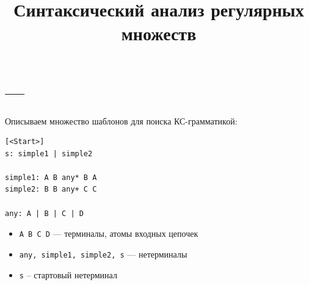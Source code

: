\documentclass[a5paper]{article}
\title{Синтаксический анализ регулярных множеств}
\begin{document}




\section*{---}

Описываем множество шаблонов для поиска КС-грамматикой:
\begin{verbatim}
[<Start>]
s: simple1 | simple2 

simple1: A B any* B A
simple2: B B any+ C C

any: A | B | C | D
\end{verbatim}

\begin{itemize}
\item \texttt{A B C D} --- терминалы, атомы входных цепочек
\item \texttt{any, simple1, simple2, s} --- нетерминалы
\item \texttt{s} -- стартовый нетерминал
\end{itemize}
\end{document}
